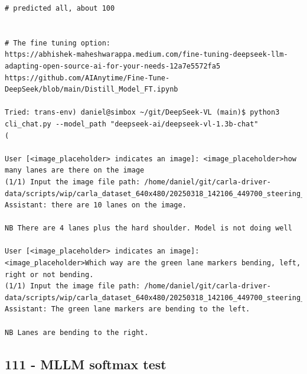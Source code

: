 \begin{verbatim}
# predicted all, about 100


# The fine tuning option:
https://abhishek-maheshwarappa.medium.com/fine-tuning-deepseek-llm-adapting-open-source-ai-for-your-needs-12a7e5572fa5
https://github.com/AIAnytime/Fine-Tune-DeepSeek/blob/main/Distill_Model_FT.ipynb

Tried: trans-env) daniel@simbox ~/git/DeepSeek-VL (main)$ python3 cli_chat.py --model_path "deepseek-ai/deepseek-vl-1.3b-chat"
( 

User [<image_placeholder> indicates an image]: <image_placeholder>how many lanes are there on the image
(1/1) Input the image file path: /home/daniel/git/carla-driver-data/scripts/wip/carla_dataset_640x480/20250318_142106_449700_steering_0.0214_lanes.jpg
Assistant: there are 10 lanes on the image.

NB There are 4 lanes plus the hard shoulder. Model is not doing well

User [<image_placeholder> indicates an image]: <image_placeholder>Which way are the green lane markers bending, left, right or not bending.
(1/1) Input the image file path: /home/daniel/git/carla-driver-data/scripts/wip/carla_dataset_640x480/20250318_142106_449700_steering_0.0214_lanes.jpg
Assistant: The green lane markers are bending to the left.

NB Lanes are bending to the right. 

\end{verbatim}

\subsection{111 - MLLM softmax test}
\label{app_res:111}

